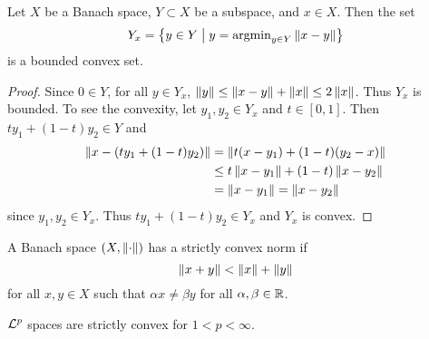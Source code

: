 \begin{theorem}
    Let $X$ be a Banach space, $Y\subset X$ be a subspace, and $x\in X$. Then the 
    set 
    \begin{equation*}
        Y_x = \left\{ y\in Y \;\middle\vert\; y = \operatorname{argmin}_{y\in Y}\left\lVert {x-y} \right\rVert \right\}
    \end{equation*} 
    is a bounded convex set. 
\end{theorem}
\begin{proof}
    Since $0\in Y$, for all $y\in Y_x$, $\left\lVert {y} \right\rVert \leq \left\lVert {x-y} \right\rVert + \left\lVert {x} \right\rVert \leq 2\left\lVert {x} \right\rVert$. 
    Thus $Y_x$ is bounded. To see the convexity, let $y_1,y_2\in Y_x$ and $t\in[0,1]$. 
    Then $ty_1 + (1-t)y_2\in Y$ and
    \begin{equation*}
        \begin{split}
            \norm{x-\pth{ty_1 + (1-t)y_2}} &= \norm{t(x-y_1) + (1-t)(y_2-x)} \\
            &\leq t\norm{x-y_1} + (1-t)\norm{x-y_2} \\
            &= \norm{x-y_1} = \norm{x-y_2}
        \end{split}
    \end{equation*}
    since $y_1,y_2\in Y_x$. Thus $ty_1 + (1-t)y_2\in Y_x$ and $Y_x$ is convex.
\end{proof}

\begin{definition}
    A Banach space $(X,\left\lVert {\cdot} \right\rVert)$ has a strictly convex norm if 
    \begin{equation*}
        \left\lVert {x + y} \right\rVert < \left\lVert {x} \right\rVert + \left\lVert {y} \right\rVert
    \end{equation*}
    for all $x,y\in X$ such that $\alpha x \neq \beta y$ for all $\alpha,\beta\in\mathbb{R}$.
\end{definition}

\begin{remark}
    $\mathcal{L}^p$ spaces are strictly convex for $1<p<\infty$.
\end{remark}